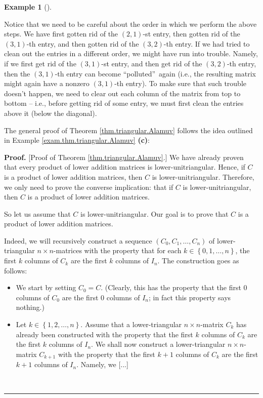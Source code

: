 \documentclass[numbers=enddot,12pt,final,onecolumn,notitlepage]{scrartcl}%
\theoremstyle{definition}
\newtheorem{exam}[theo]{Example}
\newenvironment{example}[1][]
{\begin{exam}[#1]\begin{leftbar}}
{\end{leftbar}\end{exam}}
\newenvironment{proof}[1][Proof]{\noindent\textbf{#1.} }{\ \rule{0.5em}{0.5em}}
\begin{document}
\begin{example}
Notice that we need to be careful about the order in which we perform the
above steps. We have first gotten rid of the $\left(  2,1\right)  $-st entry,
then gotten rid of the $\left(  3,1\right)  $-th entry, and then gotten rid of
the $\left(  3,2\right)  $-th entry. If we had tried to clean out the entries
in a different order, we might have run into trouble. Namely, if we first get
rid of the $\left(  3,1\right)  $-st entry, and then get rid of the $\left(
3,2\right)  $-th entry, then the $\left(  3,1\right)  $-th entry can become
\textquotedblleft polluted\textquotedblright\ again (i.e., the resulting
matrix might again have a nonzero $\left(  3,1\right)  $-th entry). To make
sure that such trouble doesn't happen, we need to clear out each column of the
matrix from top to bottom -- i.e., before getting rid of some entry, we must
first clean the entries above it (below the diagonal).
\end{example}

The general proof of Theorem \ref{thm.triangular.Alamuv} follows the idea
outlined in Example \ref{exam.thm.triangular.Alamuv} \textbf{(c)}:

\begin{proof}
[Proof of Theorem \ref{thm.triangular.Alamuv}.] We have already proven that
every product of lower addition matrices is lower-unitriangular. Hence, if $C$
is a product of lower addition matrices, then $C$ is lower-unitriangular.
Therefore, we only need to prove the converse implication: that if $C$ is
lower-unitriangular, then $C$ is a product of lower addition matrices.

So let us assume that $C$ is lower-unitriangular. Our goal is to prove that
$C$ is a product of lower addition matrices.

Indeed, we will recursively construct a sequence $\left(  C_{0},C_{1}%
,\ldots,C_{n}\right)  $ of lower-triangular $n\times n$-matrices with the
property that for each $k\in\left\{  0,1,\ldots,n\right\}  $, the first $k$
columns of $C_{k}$ are the first $k$ columns of $I_{n}$. The construction goes
as follows:

\begin{itemize}
\item We start by setting $C_{0}=C$. (Clearly, this has the property that the
first $0$ columns of $C_{0}$ are the first $0$ columns of $I_{n}$; in fact
this property says nothing.)

\item Let $k\in\left\{  1,2,\ldots,n\right\}  $. Assume that a
lower-triangular $n\times n$-matrix $C_{k}$ has already been constructed with
the property that the first $k$ columns of $C_{k}$ are the first $k$ columns
of $I_{n}$. We shall now construct a lower-triangular $n\times n$-matrix
$C_{k+1}$ with the property that the first $k+1$ columns of $C_{k}$ are the
first $k+1$ columns of $I_{n}$. Namely, we [...]
\end{itemize}
\end{proof}
\end{document}
